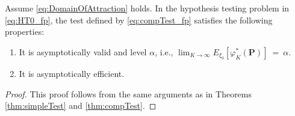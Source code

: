 \begin{theorem}\label{thm:compTest_fp}
Assume \eqref{eq:DomainOfAttraction} holds. In the hypothesis testing problem in \eqref{eq:HT0_fp}, the test defined by \eqref{eq:compTest_fp} satisfies the following properties:
\begin{enumerate}
\item It is asymptotically valid and level $\alpha $, i.e., $\lim_{K\to \infty }E_{\xi_0 }[ \varphi _{K}^{\ast }( \mathbf{P}) ] ~= ~\alpha .$
\item It is asymptotically efficient.
\end{enumerate}
\end{theorem}
\begin{proof}
This proof follows from the same arguments as in Theorems \ref{thm:simpleTest} and \ref{thm:compTest}.
\end{proof}


